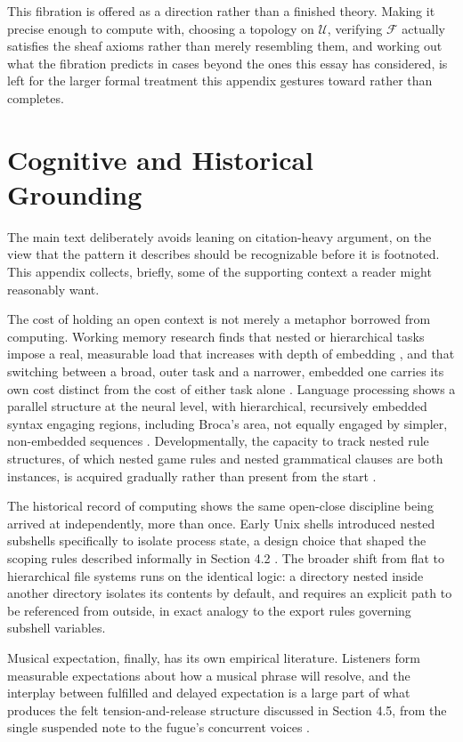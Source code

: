 \documentclass[11pt]{article}
\begin{document}
This fibration is offered as a direction rather than a finished theory. Making it precise enough to compute with, choosing a topology on $\mathcal{U}$, verifying $\mathcal{F}$ actually satisfies the sheaf axioms rather than merely resembling them, and working out what the fibration predicts in cases beyond the ones this essay has considered, is left for the larger formal treatment this appendix gestures toward rather than completes.

\section{Cognitive and Historical Grounding}

The main text deliberately avoids leaning on citation-heavy argument, on the view that the pattern it describes should be recognizable before it is footnoted. This appendix collects, briefly, some of the supporting context a reader might reasonably want.

The cost of holding an open context is not merely a metaphor borrowed from computing. Working memory research finds that nested or hierarchical tasks impose a real, measurable load that increases with depth of embedding \cite{baddeley2003}, and that switching between a broad, outer task and a narrower, embedded one carries its own cost distinct from the cost of either task alone \cite{monsell2003}. Language processing shows a parallel structure at the neural level, with hierarchical, recursively embedded syntax engaging regions, including Broca's area, not equally engaged by simpler, non-embedded sequences \cite{friederici2011}. Developmentally, the capacity to track nested rule structures, of which nested game rules and nested grammatical clauses are both instances, is acquired gradually rather than present from the start \cite{piaget1962}.

The historical record of computing shows the same open-close discipline being arrived at independently, more than once. Early Unix shells introduced nested subshells specifically to isolate process state, a design choice that shaped the scoping rules described informally in Section 4.2 \cite{unix-history}. The broader shift from flat to hierarchical file systems runs on the identical logic: a directory nested inside another directory isolates its contents by default, and requires an explicit path to be referenced from outside, in exact analogy to the export rules governing subshell variables.

Musical expectation, finally, has its own empirical literature. Listeners form measurable expectations about how a musical phrase will resolve, and the interplay between fulfilled and delayed expectation is a large part of what produces the felt tension-and-release structure discussed in Section 4.5, from the single suspended note to the fugue's concurrent voices \cite{huron2006}.
\end{document}

